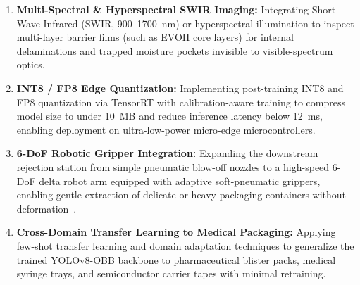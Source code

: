 \begin{enumerate}
\item \textbf{Multi-Spectral \& Hyperspectral SWIR Imaging:} Integrating Short-Wave Infrared (SWIR, 900--1700~nm) or hyperspectral illumination to inspect multi-layer barrier films (such as EVOH core layers) for internal delaminations and trapped moisture pockets invisible to visible-spectrum optics.
\item \textbf{INT8 / FP8 Edge Quantization:} Implementing post-training INT8 and FP8 quantization via TensorRT with calibration-aware training to compress model size to under 10~MB and reduce inference latency below 12~ms, enabling deployment on ultra-low-power micro-edge microcontrollers.
\item \textbf{6-DoF Robotic Gripper Integration:} Expanding the downstream rejection station from simple pneumatic blow-off nozzles to a high-speed 6-DoF delta robot arm equipped with adaptive soft-pneumatic grippers, enabling gentle extraction of delicate or heavy packaging containers without deformation~\cite{zhang2024robotic}.
\item \textbf{Cross-Domain Transfer Learning to Medical Packaging:} Applying few-shot transfer learning and domain adaptation techniques to generalize the trained YOLOv8-OBB backbone to pharmaceutical blister packs, medical syringe trays, and semiconductor carrier tapes with minimal retraining.
\end{enumerate}
